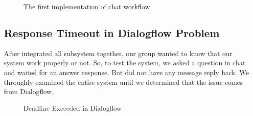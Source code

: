 \documentclass[12pt,oneside,openright,a4paper]{cpe-english-project}
\begin{document}
\begin{figure}[!h]\centering
{}
\caption{The first implementation of chat workflow}
\label{fig:model_pattern1}
\end{figure}

\subsection{Response Timeout in Dialogflow Problem}
\label{response_timeout_problem_section}
After integrated all subsystem together, our group wanted to know that our system work properly or not.
So, to test the system, we asked a question in chat and waited for an answer response. But did not have
any message reply back. We throughly examined the entire system until we determined that the issue
comes from Dialogflow.

\begin{figure}[!h]\centering
{}
\caption{Deadline Exceeded in Dialogflow}
\label{fig:dialogflow_deadline_exceed}
\end{figure}
\end{document}
